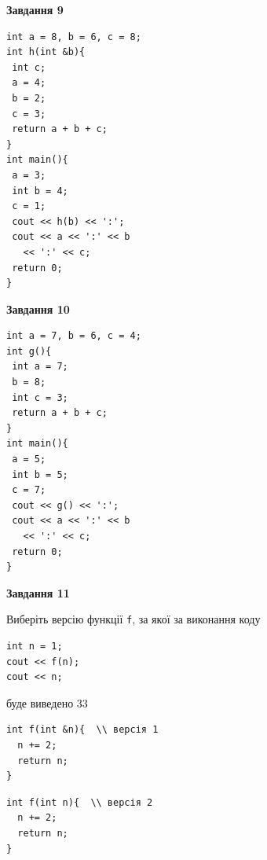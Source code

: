 \documentclass[12pt, ukrainian]{article}
\def\code#1{\Verb!#1!}
\begin{document}
{\begin {large}
\begin{minipage}[t]{11.0cm}
\end{minipage}


\begin{minipage}[t]{7.0cm}

\begin{center}
\textbf{Завдання 9}
\end{center}
\vspace{-8mm}

\begin{verbatim}
int a = 8, b = 6, c = 8;
int h(int &b){
 int c;
 a = 4;
 b = 2;
 c = 3;
 return a + b + c;
}
int main(){
 a = 3;
 int b = 4;
 c = 1;
 cout << h(b) << ':';
 cout << a << ':' << b 
   << ':' << c;
 return 0;
}
\end{verbatim}



\begin{center}
\textbf{Завдання 10}
\end{center}
\vspace{-8mm}

\begin{verbatim}
int a = 7, b = 6, c = 4;
int g(){
 int a = 7;
 b = 8;
 int c = 3;
 return a + b + c;
}
int main(){
 a = 5;
 int b = 5;
 c = 7;
 cout << g() << ':';
 cout << a << ':' << b 
   << ':' << c;
 return 0;
}
\end{verbatim}

\end{minipage}
\vline \hspace{1mm}
\begin{minipage}[t]{11.0cm}

\begin{center}
\textbf{Завдання 11}
\end{center}
Виберіть версію функції \code{f}, за якої за виконання коду
\begin{verbatim}
int n = 1;
cout << f(n);
cout << n;
\end{verbatim}

буде виведено 33

\begin{verbatim}
int f(int &n){  \\ версія 1
  n += 2;
  return n;
}
\end{verbatim}

\vspace{-8mm}\begin{verbatim}
int f(int n){  \\ версія 2
  n += 2;
  return n;
}
\end{verbatim}


\end{minipage}
\end{large}}
\end{document}
